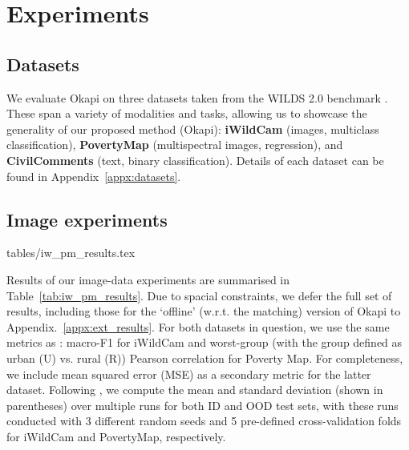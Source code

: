 \section{Experiments}\label{sec:exps}
\subsection{Datasets}\label{sec:exps_datasets} We evaluate Okapi on three datasets taken from the
WILDS 2.0 benchmark \cite{SagWeiLeeGaoetal22}. These span a variety of modalities and tasks,
allowing us to showcase the generality of our proposed method (Okapi): \textbf{iWildCam} (images,
multiclass classification), \textbf{PovertyMap} (multispectral images, regression), and
\textbf{CivilComments} (text, binary classification). 
Details of each dataset can be found in Appendix~\ref{appx:datasets}.

\subsection{Image experiments}

{tables/iw_pm_results.tex}

Results of our image-data experiments are summarised in Table~\ref{tab:iw_pm_results}. Due to
spacial constraints, we defer the full set of results, including those for the `offline' (w.r.t.
the matching) version of Okapi to Appendix.~\ref{appx:ext_results}. For both datasets in question,
we use the same metrics as \cite{SagWeiLeeGaoetal22}: macro-F1 for iWildCam and worst-group (with
the group defined as urban (U) vs. rural (R)) Pearson correlation for Poverty Map. For
completeness, we include mean squared error (MSE) as a secondary metric for the latter dataset.
Following \cite{SagWeiLeeGaoetal22}, we compute the mean and standard deviation (shown in
parentheses) over multiple runs for both ID and OOD test sets, with these runs conducted with 3
different random seeds and 5 pre-defined cross-validation folds for iWildCam and PovertyMap,
respectively.

